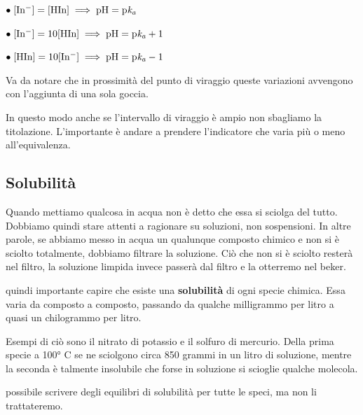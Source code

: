 \vspace{0.2cm}$\bullet \rm \; [In^-]=[HIn] \implies pH=p\textit{k}_{\textit{a}}$

\vspace{0.2cm}$\bullet \rm \; [In^-]=10[HIn] \implies pH=p\textit{k}_{\textit{a}}+1$

\vspace{0.2cm}$\bullet \rm \; [HIn]=10[In^-] \implies pH=p\textit{k}_{\textit{a}}-1$

\vspace{0.2cm}Va da notare che in prossimità del punto di viraggio queste variazioni avvengono con l'aggiunta di una sola goccia.

In questo modo anche se l'intervallo di viraggio è ampio non sbagliamo la titolazione. L'importante è andare a prendere l'indicatore che varia più o meno all'equivalenza.
\subsection{Solubilità}
Quando mettiamo qualcosa in acqua non è detto che essa si sciolga del tutto. Dobbiamo quindi stare attenti a ragionare su soluzioni, non sospensioni. In altre parole, se abbiamo messo in acqua un qualunque composto chimico e non si è sciolto totalmente, dobbiamo filtrare la soluzione. Ciò che non si è sciolto resterà nel filtro, la soluzione limpida invece passerà dal filtro e la otterremo nel beker.

\E quindi importante capire che esiste una \textbf{solubilità} di ogni specie chimica. Essa varia da composto a composto, passando da qualche milligrammo per litro a quasi un chilogrammo per litro.

Esempi di ciò sono il nitrato di potassio e il solfuro di mercurio. Della prima specie a 100° C se ne sciolgono circa 850 grammi in un litro di soluzione, mentre la seconda è talmente insolubile che forse in soluzione si scioglie qualche molecola.

\E possibile scrivere degli equilibri di solubilità per tutte le speci, ma non li trattateremo.